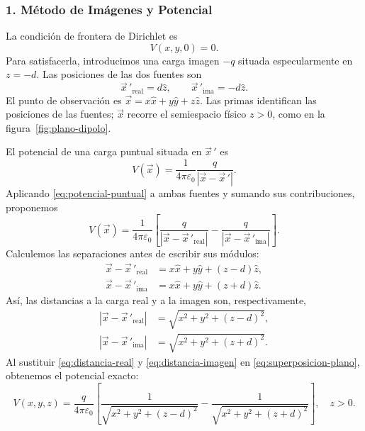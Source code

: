 \documentclass[11pt]{article}
\begin{document}
\subsubsection*{1. Método de Imágenes y Potencial}
La condición de frontera de Dirichlet es
\[
 V(x,y,0)=0.
\]
Para satisfacerla, introducimos una carga imagen $-q$ situada
especularmente en $z=-d$. Las posiciones de las dos fuentes son
\begin{equation}
 \vec{x}\,'_{\mathrm{real}}=d\hat{z},\qquad
 \vec{x}\,'_{\mathrm{ima}}=-d\hat{z}.
 \label{eq:fuentes}
\end{equation}
El punto de observación es $\vec{x}=x\hat{x}+y\hat{y}+z\hat{z}$.
Las primas identifican las posiciones de las fuentes; $\vec{x}$ recorre
el semiespacio físico $z>0$, como en la figura~\ref{fig:plano-dipolo}.

El potencial de una carga puntual situada en $\vec{x}\,'$ es
\begin{equation}
 V(\vec{x})=\frac{1}{4\pi\varepsilon_0}
 \frac{q}{|\vec{x}-\vec{x}\,'|}.
 \label{eq:potencial-puntual}
\end{equation}
Aplicando \eqref{eq:potencial-puntual} a ambas fuentes y sumando sus
contribuciones, proponemos
\begin{equation}
 V(\vec{x})=\frac{1}{4\pi\varepsilon_0}
 \left[\frac{q}{|\vec{x}-\vec{x}\,'_{\mathrm{real}}|}
       -\frac{q}{|\vec{x}-\vec{x}\,'_{\mathrm{ima}}|}\right].
 \label{eq:superposicion-plano}
\end{equation}
Calculemos las separaciones antes de escribir sus módulos:
\begin{align*}
 \vec{x}-\vec{x}\,'_{\mathrm{real}}
 &=x\hat{x}+y\hat{y}+(z-d)\hat{z},\\
 \vec{x}-\vec{x}\,'_{\mathrm{ima}}
 &=x\hat{x}+y\hat{y}+(z+d)\hat{z}.
\end{align*}
Así, las distancias a la carga real y a la imagen son, respectivamente,
\begin{align}
 |\vec{x}-\vec{x}\,'_{\mathrm{real}}|
 &=\sqrt{x^2+y^2+(z-d)^2},\label{eq:distancia-real}\\
 |\vec{x}-\vec{x}\,'_{\mathrm{ima}}|
 &=\sqrt{x^2+y^2+(z+d)^2}.\label{eq:distancia-imagen}
\end{align}
Al sustituir \eqref{eq:distancia-real} y \eqref{eq:distancia-imagen}
en \eqref{eq:superposicion-plano}, obtenemos el potencial exacto:
\begin{equation}
 \boxed{V(x,y,z)=\frac{q}{4\pi\varepsilon_0}
 \left[\frac{1}{\sqrt{x^2+y^2+(z-d)^2}}
       -\frac{1}{\sqrt{x^2+y^2+(z+d)^2}}\right],\quad z>0.}
 \label{eq:plano-potencial}
\end{equation}
\end{document}
